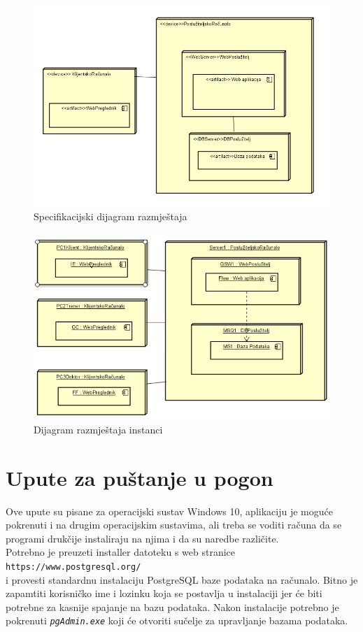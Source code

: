 			\begin{figure}[h]
				\centering
				\includegraphics[scale=0.8]{dijagrami/DijagramRazmjestaja}
				\caption{Specifikacijski dijagram razmještaja}
			\end{figure}
			
			\begin{figure}
				\centering
				\includegraphics[scale=1]{dijagrami/DijagramRazmjestaja2}
				\caption{Dijagram razmještaja instanci}
			\end{figure}
			\eject 
		
		\section{Upute za puštanje u pogon}
		
			Ove upute su pisane za operacijski sustav Windows 10, aplikaciju je moguće pokrenuti i na drugim operacijskim sustavima, ali treba se voditi računa da se programi drukčije instaliraju na njima i da su naredbe različite.
			\\
			Potrebno je preuzeti installer datoteku s web stranice
			\\ 
			\texttt{\small https://www.postgresql.org/}
			\\
			i provesti standardnu instalaciju PostgreSQL baze podataka na računalo. Bitno je zapamtiti korisničko ime i lozinku koja se postavlja u instalaciji jer će biti potrebne za kasnije spajanje na bazu podataka. Nakon instalacije potrebno je pokrenuti \texttt{\textit{pgAdmin.exe}} koji će otvoriti sučelje za upravljanje bazama podataka.
			
